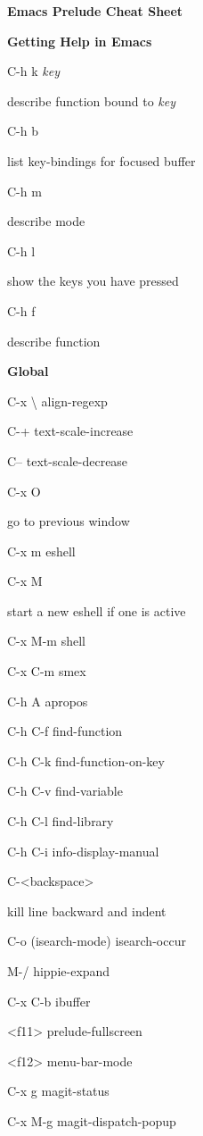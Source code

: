 \documentclass[10pt]{article}
\renewcommand\section[1]{\bigskip\par\textbf{\color{heading}\large#1}\smallskip}
\newcommand\humanreadable[1]{{\par\color{default}\small\sffamily#1}}
\newcommand\meta[1]{\textlangle\textit{#1}\textrangle}
\begin{document}
\begin{multicols}{4}

  \setlength{\columnsep}{1cm}
  \begin{center}
    \LARGE\color{heading}\textbf{Emacs Prelude Cheat Sheet}
  \end{center}

  \section{Getting Help in Emacs}
  \begin{keylist}
  \item[C-h k \meta{key}] \humanreadable{describe function bound to \meta{key}}
  \item[C-h b] \humanreadable{list key-bindings for focused buffer}
  \item[C-h m] \humanreadable{describe mode}
  \item[C-h l] \humanreadable{show the keys you have pressed}
  \item[C-h f] \humanreadable{describe function}
  \end{keylist}

  \section{Global}
  \begin{keylist}
  \item[C-x \textbackslash] align-regexp
  \item[C-+] text-scale-increase
  \item[C--] text-scale-decrease
  \item[C-x O] \humanreadable{go to previous window}
  \item[C-x m] eshell
  \item[C-x M] \humanreadable{start a new eshell if one is active}
  \item[C-x M-m] shell
  \item[C-x C-m] smex
  \item[C-h A] apropos
  \item[C-h C-f] find-function
  \item[C-h C-k] find-function-on-key
  \item[C-h C-v] find-variable
  \item[C-h C-l] find-library
  \item[C-h C-i] info-display-manual
  \item[C-<backspace>] \humanreadable{kill line backward and indent}
  \item[C-o] (isearch-mode) isearch-occur
  \item[M-/] hippie-expand
  \item[C-x C-b] ibuffer
  \item[<f11>] prelude-fullscreen
  \item[<f12>] menu-bar-mode
  \item[C-x g] magit-status
  \item[C-x M-g] magit-dispatch-popup
  \end{keylist}


\end{multicols}
\end{document}
